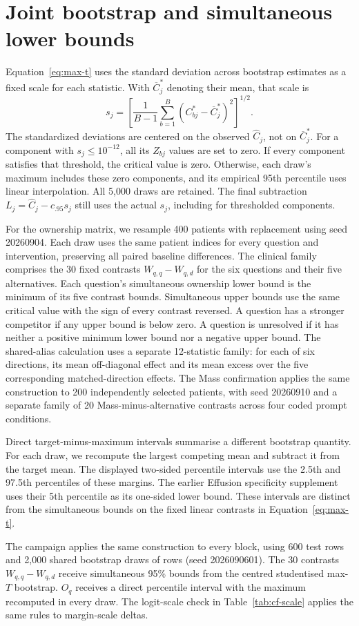 \section{Joint bootstrap and simultaneous lower bounds}
\label{app:simultaneous-bounds}

Equation~\ref{eq:max-t} uses the standard deviation across bootstrap
estimates as a fixed scale for each statistic. With $\overline C^*_j$
denoting their mean, that scale is
\begin{equation}
s_j=\left[\frac{1}{B-1}\sum_{b=1}^{B}
       (C^*_{bj}-\overline C^*_j)^2\right]^{1/2}.
\label{eq:bootstrap-scale}
\end{equation}
The standardized deviations are centered on the observed $\widehat C_j$,
not on $\overline C^*_j$. For a component with $s_j\leq10^{-12}$,
all its $Z_{bj}$ values are set to zero. If every component satisfies
that threshold, the critical value is zero. Otherwise, each draw's
maximum includes these zero components, and its empirical 95th percentile
uses linear interpolation. All 5,000 draws are retained. The final
subtraction $L_j=\widehat C_j-c_{.95}s_j$ still uses the actual $s_j$,
including for thresholded components.

For the ownership matrix, we resample 400 patients with replacement using seed 20260904. Each draw uses the same patient indices for every question and intervention, preserving all paired baseline differences. The clinical family comprises the 30 fixed contrasts $W_{q,q}-W_{q,d}$ for the six questions and their five alternatives. Each question's simultaneous ownership lower bound is the minimum of its five contrast bounds. Simultaneous upper bounds use the same critical value with the sign of every contrast reversed. A question has a stronger competitor if any upper bound is below zero. A question is unresolved if it has neither a positive minimum lower bound nor a negative upper bound. The shared-alias calculation uses a separate 12-statistic family: for each of six directions, its mean off-diagonal effect and its mean excess over the five corresponding matched-direction effects. The Mass confirmation applies the same construction to 200 independently selected patients, with seed 20260910 and a separate family of 20 Mass-minus-alternative contrasts across four coded prompt conditions.

Direct target-minus-maximum intervals summarise a different bootstrap quantity. For each draw, we recompute the largest competing mean and subtract it from the target mean. The displayed two-sided percentile intervals use the 2.5th and 97.5th percentiles of these margins. The earlier Effusion specificity supplement uses their 5th percentile as its one-sided lower bound. These intervals are distinct from the simultaneous bounds on the fixed linear contrasts in Equation~\ref{eq:max-t}.

The campaign applies the same construction to every block, using 600 test rows and 2{,}000 shared bootstrap draws of rows (seed 2026090601). The 30 contrasts $W_{q,q}-W_{q,d}$ receive simultaneous 95\% bounds from the centred studentised max-$T$ bootstrap. $O_q$ receives a direct percentile interval with the maximum recomputed in every draw. The logit-scale check in Table~\ref{tab:cf-scale} applies the same rules to margin-scale deltas.